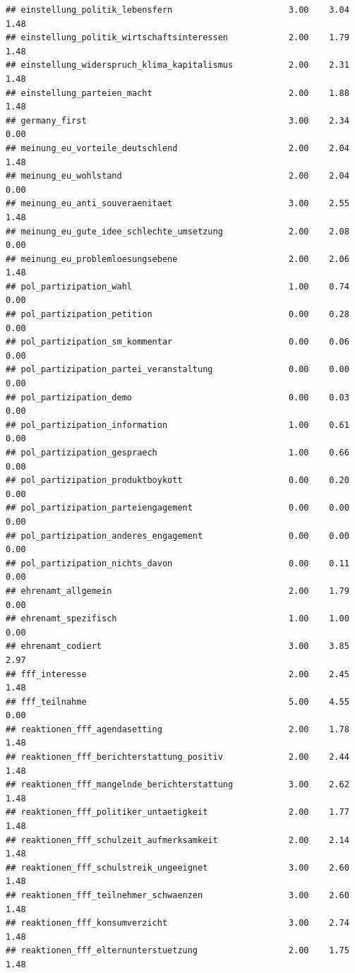 \documentclass[
]{book}
\begin{document}
\begin{verbatim}
## einstellung_politik_lebensfern                       3.00    3.04   1.48
## einstellung_politik_wirtschaftsinteressen            2.00    1.79   1.48
## einstellung_widerspruch_klima_kapitalismus           2.00    2.31   1.48
## einstellung_parteien_macht                           2.00    1.88   1.48
## germany_first                                        3.00    2.34   0.00
## meinung_eu_vorteile_deutschlend                      2.00    2.04   1.48
## meinung_eu_wohlstand                                 2.00    2.04   0.00
## meinung_eu_anti_souveraenitaet                       3.00    2.55   1.48
## meinung_eu_gute_idee_schlechte_umsetzung             2.00    2.08   0.00
## meinung_eu_problemloesungsebene                      2.00    2.06   1.48
## pol_partizipation_wahl                               1.00    0.74   0.00
## pol_partizipation_petition                           0.00    0.28   0.00
## pol_partizipation_sm_kommentar                       0.00    0.06   0.00
## pol_partizipation_partei_veranstaltung               0.00    0.00   0.00
## pol_partizipation_demo                               0.00    0.03   0.00
## pol_partizipation_information                        1.00    0.61   0.00
## pol_partizipation_gespraech                          1.00    0.66   0.00
## pol_partizipation_produktboykott                     0.00    0.20   0.00
## pol_partizipation_parteiengagement                   0.00    0.00   0.00
## pol_partizipation_anderes_engagement                 0.00    0.00   0.00
## pol_partizipation_nichts_davon                       0.00    0.11   0.00
## ehrenamt_allgemein                                   2.00    1.79   0.00
## ehrenamt_spezifisch                                  1.00    1.00   0.00
## ehrenamt_codiert                                     3.00    3.85   2.97
## fff_interesse                                        2.00    2.45   1.48
## fff_teilnahme                                        5.00    4.55   0.00
## reaktionen_fff_agendasetting                         2.00    1.78   1.48
## reaktionen_fff_berichterstattung_positiv             2.00    2.44   1.48
## reaktionen_fff_mangelnde_berichterstattung           3.00    2.62   1.48
## reaktionen_fff_politiker_untaetigkeit                2.00    1.77   1.48
## reaktionen_fff_schulzeit_aufmerksamkeit              2.00    2.14   1.48
## reaktionen_fff_schulstreik_ungeeignet                3.00    2.60   1.48
## reaktionen_fff_teilnehmer_schwaenzen                 3.00    2.60   1.48
## reaktionen_fff_konsumverzicht                        3.00    2.74   1.48
## reaktionen_fff_elternunterstuetzung                  2.00    1.75   1.48

\end{verbatim}
\end{document}
